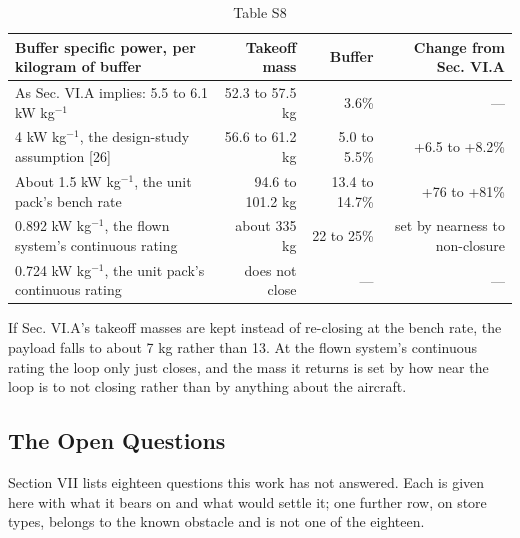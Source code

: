 \documentclass[journal]{new-aiaa}
\begin{document}
\begin{table}[htbp]
\centering
\caption*{Table S8}
\small
\begin{tabularx}{\linewidth}{Xrrr}
\hline
Buffer specific power, per kilogram of buffer & Takeoff mass & Buffer & Change from Sec. VI.A \\ \hline
As Sec. VI.A implies: 5.5 to 6.1 kW kg$^{-1}$ & 52.3 to 57.5 kg & 3.6\% & --- \\
4 kW kg$^{-1}$, the design-study assumption [26] & 56.6 to 61.2 kg & 5.0 to 5.5\% & +6.5 to +8.2\% \\
About 1.5 kW kg$^{-1}$, the unit pack's bench rate & 94.6 to 101.2 kg & 13.4 to 14.7\% & +76 to +81\% \\
0.892 kW kg$^{-1}$, the flown system's continuous rating & about 335 kg & 22 to 25\% & set by nearness to non-closure \\
0.724 kW kg$^{-1}$, the unit pack's continuous rating & does not close & --- & --- \\
\hline
\end{tabularx}
\end{table}

If Sec. VI.A's takeoff masses are kept instead of re-closing at the bench rate, the payload falls to about 7 kg rather than 13. At the flown system's continuous rating the loop only just closes, and the mass it returns is set by how near the loop is to not closing rather than by anything about the aircraft.

\subsection*{The Open Questions}

Section VII lists eighteen questions this work has not answered. Each is given here with what it bears on and what would settle it; one further row, on store types, belongs to the known obstacle and is not one of the eighteen.
\end{document}
